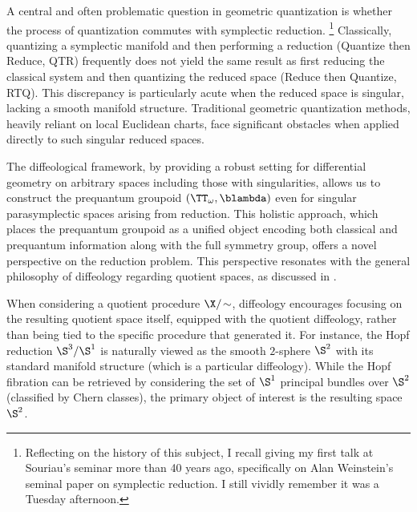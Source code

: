   
  
  \begin{article}
    \label{art: Application to Symplectic Reduction}
    
    A central and often problematic question in geometric quantization is whether the process of quantization commutes with symplectic reduction.%
    \footnote{Reflecting on the history of this subject,
    I recall giving my first talk at Souriau's seminar more than 40 years ago, specifically on Alan Weinstein's seminal paper on symplectic reduction.
    I still vividly remember it was a Tuesday afternoon.}
    Classically,
    quantizing a symplectic manifold and then performing a reduction (Quantize then Reduce, QTR) frequently does not yield the same result as first reducing the classical system and then quantizing the reduced space (Reduce then Quantize, RTQ).
    This discrepancy is particularly acute when the reduced space is singular,
    lacking a smooth manifold structure.
    Traditional geometric quantization methods,
    heavily reliant on local Euclidean charts,
    face significant obstacles when applied directly to such singular reduced spaces.
    
    The diffeological framework,
    by providing a robust setting for differential geometry on arbitrary spaces including those with singularities,
    allows us to construct the prequantum groupoid $(\TT_\omega, \blambda)$ even for singular parasymplectic spaces arising from reduction.
    This holistic approach,
    which places the prequantum groupoid as a unified object encoding both classical and prequantum information along with the full symmetry group,
    offers a novel perspective on the reduction problem.
    This perspective resonates with the general philosophy of diffeology regarding quotient spaces,
    as discussed in \cite{GIZ25}.
    
    When considering a quotient procedure $\X/\!\sim$,
    diffeology encourages focusing on the resulting quotient space itself,
    equipped with the quotient diffeology, rather than being tied to the specific procedure that generated it.
    For instance,
    the Hopf reduction $\S^3/\S^1$ is naturally viewed as the smooth $2$-sphere $\S^2$ with its standard manifold structure (which is a particular diffeology).
    While the Hopf fibration can be retrieved by considering the set of $\S^1$ principal bundles over $\S^2$ (classified by Chern classes),
    the primary object of interest is the resulting space $\S^2$.
    

\end{article}
